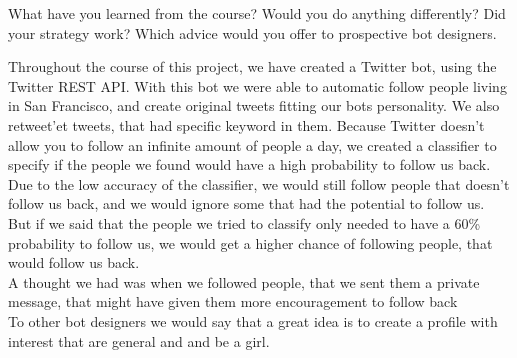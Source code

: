 What have you learned from the course? 
Would you do anything differently? 
Did your strategy work? 
Which advice would you offer to prospective bot designers.

Throughout the course of this project, we have created a Twitter bot, using the Twitter REST API. With this bot we were able to automatic follow people living in San Francisco, and create original tweets fitting our bots personality. We also retweet'et tweets, that had specific keyword in them. Because Twitter doesn't allow you to follow an infinite amount of people a day, we created a classifier to specify if the people we found would have a high probability to follow us back. Due to the low accuracy of the classifier, we would still follow people that doesn't follow us back, and we would ignore some that had the potential to follow us. But if we said that the people we tried to classify only needed to have a 60\% probability to follow us, we would get a higher chance of following people, that would follow us back.\\
A thought we had was when we followed people, that we sent them a private message, that might have given them more encouragement to follow back\\
To other bot designers we would say that a great idea is to create a profile with interest that are general and and be a girl. 